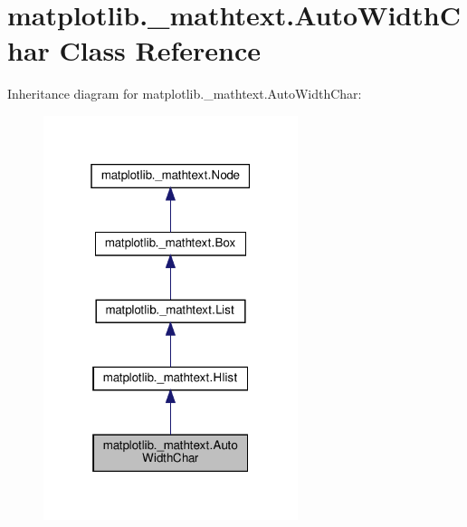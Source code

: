 \hypertarget{classmatplotlib_1_1__mathtext_1_1AutoWidthChar}{}\section{matplotlib.\+\_\+mathtext.\+Auto\+Width\+Char Class Reference}
\label{classmatplotlib_1_1__mathtext_1_1AutoWidthChar}


Inheritance diagram for matplotlib.\+\_\+mathtext.\+Auto\+Width\+Char\+:
\nopagebreak
\begin{figure}[H]
\begin{center}
\leavevmode
\includegraphics[width=211pt]{classmatplotlib_1_1__mathtext_1_1AutoWidthChar__inherit__graph}
\end{center}
\end{figure}


